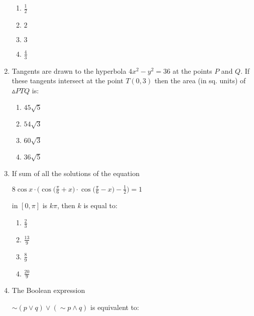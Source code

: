 \documentclass[journal,12pt,twocolumn]{IEEEtran}
\begin{document}
\begin{enumerate}[1.]
\begin{enumerate}[(1)]
\item $
\frac{1}{2}
$

\item $
2
$

\item $
3
$

\item $
\frac{4}{3}
$


\end{enumerate}
 
\item Tangents are drawn to the hyperbola $4x^2-y^2=36$ at the points $P$ and $Q$. If these tangents intersect at the point $T(0,3)$ then the area (in sq. units) of $\vartriangle PTQ $ is:

\begin{enumerate}[(1)]
 
\item $
45 \sqrt{5}
$

\item $
54 \sqrt{3}
$

\item $
60 \sqrt{3}
$

\item $
36 \sqrt{5}
$


\end{enumerate}

\item If sum of all the solutions of the equation 

$ 8\cos x\cdot \Big( \cos \Big( \frac{\pi}{6}+x \Big) \cdot \cos \Big( \frac{\pi}{6}-x \Big) - \frac{1}{2} \Big)=1 $

in $[0,\pi]$ is $k\pi$, then $k$ is equal to:

\begin{enumerate}[(1)]
 
\item $
\frac{2}{3}
$

\item $
\frac{13}{9}
$

\item $
\frac{8}{9}
$

\item $
\frac{20}{9}
$


\end{enumerate}

\item The Boolean expression

$\sim (p \vee q) \vee (\sim p \wedge q) $ is equivalent to:

\begin{enumerate}[(1)]
 

\end{enumerate}
\end{enumerate}
\end{document}
